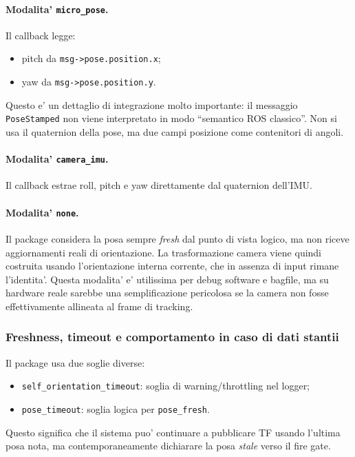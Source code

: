 \documentclass[11pt,a4paper]{article}
\newcommand{\code}[1]{\texttt{#1}}
\begin{document}
\paragraph{Modalita' \code{micro\_pose}.}
Il callback legge:
\begin{itemize}[leftmargin=1.4em]
  \item pitch da \code{msg->pose.position.x};
  \item yaw da \code{msg->pose.position.y}.
\end{itemize}

Questo e' un dettaglio di integrazione molto importante: il messaggio \code{PoseStamped} non viene interpretato in modo ``semantico ROS classico''. Non si usa il quaternion della pose, ma due campi posizione come contenitori di angoli.

\paragraph{Modalita' \code{camera\_imu}.}
Il callback estrae roll, pitch e yaw direttamente dal quaternion dell'IMU.

\paragraph{Modalita' \code{none}.}
Il package considera la posa sempre \emph{fresh} dal punto di vista logico, ma non riceve aggiornamenti reali di orientazione. La trasformazione camera viene quindi costruita usando l'orientazione interna corrente, che in assenza di input rimane l'identita'. Questa modalita' e' utilissima per debug software e bagfile, ma su hardware reale sarebbe una semplificazione pericolosa se la camera non fosse effettivamente allineata al frame di tracking.

\subsubsection{Freshness, timeout e comportamento in caso di dati stantii}

Il package usa due soglie diverse:
\begin{itemize}[leftmargin=1.4em]
  \item \code{self\_orientation\_timeout}: soglia di warning/throttling nel logger;
  \item \code{pose\_timeout}: soglia logica per \code{pose\_fresh}.
\end{itemize}

Questo significa che il sistema puo' continuare a pubblicare TF usando l'ultima posa nota, ma contemporaneamente dichiarare la posa \emph{stale} verso il fire gate.
\end{document}
